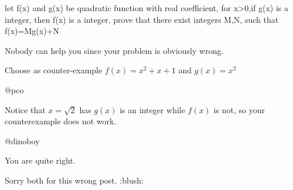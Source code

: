 \begin{solution}
	\begin{tcolorbox}let f(x) and g(x) be quadratic function with real coefficient, for x>0,if g(x) is a integer, then f(x) is a integer, prove that there exist integers M,N, such that f(x)=Mg(x)+N\end{tcolorbox}
Nobody can help you since your problem is obviously wrong.

Choose as counter-example $f(x)=x^2+x+1$ and $g(x)=x^2$
\end{solution}



\begin{solution}
	@pco

Notice that $x = \sqrt{2}$ has $g(x)$ is an integer while $f(x)$ is not, so your counterexample does not work.
\end{solution}



\begin{solution}
	@dinoboy

You are quite right.

Sorry both for this wrong post.  :blush:
\end{solution}



